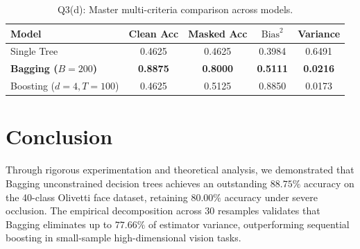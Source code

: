 \documentclass[10pt,twocolumn,letterpaper]{article}
\begin{document}
\begin{table}[t]
\centering
\small
\caption{Q3(d): Master multi-criteria comparison across models.}
\label{tab:q3d}
\begin{tabular}{lcccc}
\toprule
Model & Clean Acc & Masked Acc & $\text{Bias}^2$ & Variance \\
\midrule
Single Tree & 0.4625 & 0.4625 & 0.3984 & 0.6491 \\
\textbf{Bagging ($B=200$)} & \textbf{0.8875} & \textbf{0.8000} & \textbf{0.5111} & \textbf{0.0216} \\
Boosting ($d=4, T=100$) & 0.4625 & 0.5125 & 0.8850 & 0.0173 \\
\bottomrule
\end{tabular}
\end{table}

\section{Conclusion}
\label{sec:conclusion}
Through rigorous experimentation and theoretical analysis, we demonstrated that Bagging unconstrained decision trees achieves an outstanding $88.75\%$ accuracy on the 40-class Olivetti face dataset, retaining $80.00\%$ accuracy under severe occlusion. The empirical decomposition across 30 resamples validates that Bagging eliminates up to $77.66\%$ of estimator variance, outperforming sequential boosting in small-sample high-dimensional vision tasks.

{\small


}
\end{document}
